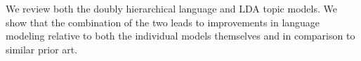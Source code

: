 We review both  the doubly hierarchical language and LDA topic models.  We show that the combination of the two leads to improvements in language modeling relative to both the individual models themselves and in comparison to similar prior art.

